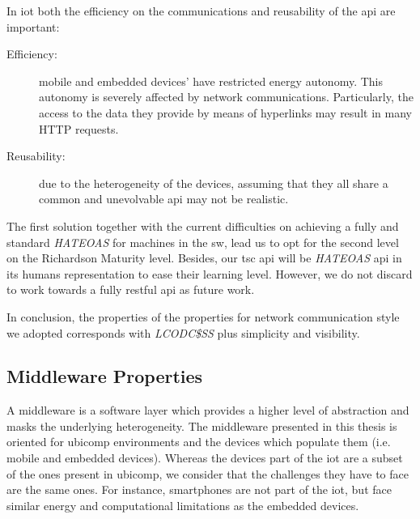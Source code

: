 In \ac{iot} both the efficiency on the communications and reusability of the \ac{api} are important:
\begin{description}
  \item[Efficiency:] mobile and embedded devices' have restricted energy autonomy.
                    This autonomy is severely affected by network communications. %
                    Particularly, the access to the data they provide by means of hyperlinks may result in many HTTP requests. %
  \item[Reusability:] due to the heterogeneity of the devices, assuming that they all share a common and unevolvable \ac{api} may not be realistic. %
\end{description}
The first solution together with the current difficulties on achieving a fully and standard \emph{HATEOAS} for machines in the \ac{sw}, lead us to opt for the second level on the Richardson Maturity level.
Besides, our \ac{tsc} \ac{api} will be \emph{HATEOAS} \ac{api} in its humans representation to ease their learning level.%
However, we do not discard to work towards a fully \ac{rest}ful \ac{api} as future work.


In conclusion, the properties of the properties for network communication style we adopted corresponds with \emph{LCODC\$SS} plus simplicity and visibility. %





\subsection{Middleware Properties}

A middleware is a software layer which provides a higher level of abstraction and masks the underlying heterogeneity.
The middleware presented in this thesis is oriented for \ac{ubicomp} environments and the devices which populate them (i.e. mobile and embedded devices).
Whereas the devices part of the \ac{iot} are a subset of the ones present in \ac{ubicomp}, we consider that the challenges they have to face are the same ones.
For instance, smartphones are not part of the \ac{iot}, but face similar energy and computational limitations as the embedded devices. %


